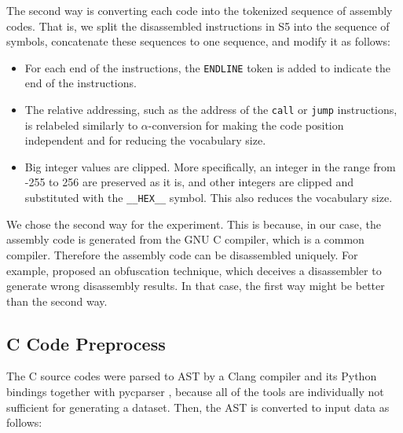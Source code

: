 \documentclass[senior,final,11pt]{iscs-thesis}
\begin{document}
The second way is converting each code into the tokenized sequence of assembly codes. 
That is, we split the disassembled instructions in S5 into the sequence of symbols, 
concatenate these sequences to one sequence, 
and modify it as follows:
\begin{itemize}
\item For each end of the instructions, the \texttt{ENDLINE} token is added to indicate the end of the instructions.
\item 
The relative addressing, such as the address of the \texttt{call} or \texttt{jump} instructions, 
is relabeled similarly to $\alpha$-conversion for making the code position independent and for reducing the vocabulary size.
\item Big integer values are clipped. 
More specifically, an integer in the range from -255 to 256 are preserved as it is, and other integers are clipped and substituted with the \texttt{\_\_HEX\_\_} symbol.
This also reduces the vocabulary size.
\end{itemize}

We chose the second way for the experiment.
This is because, in our case, the assembly code is generated from the GNU C compiler, which is a common compiler.
Therefore the assembly code can be disassembled uniquely.
For example, \citet{disasm_obfuscate} proposed an obfuscation technique, which deceives a disassembler to generate wrong disassembly results.
In that case, the first way might be better than the second way.

\subsection{C Code Preprocess}
The C source codes were parsed to AST by a Clang compiler \citep{clang} and its Python bindings together with pycparser \citep{pycparser}, 
because all of the tools are individually not sufficient for generating a dataset.
Then, the AST is converted to input data as follows:
\end{document}
